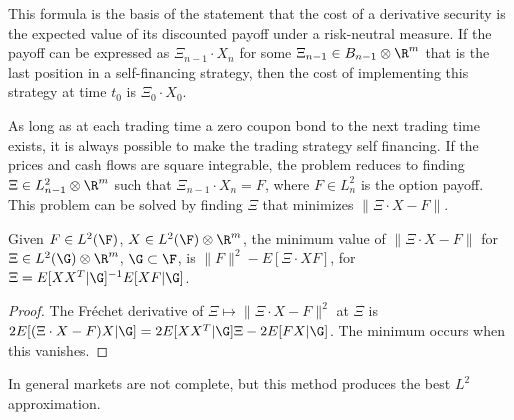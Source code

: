 This formula is the basis of the statement that the cost of a
derivative security is the expected value of its discounted payoff under
a risk-neutral measure. If the payoff can be expressed as $\Xi_{n -
1}\cdot X_n$ for some $\Xi_{n-1} \in B_{n-1}\otimes\R^m$ that
is the last position in a self-financing strategy, then the cost of
implementing this strategy at time $t_0$ is $\Xi_0\cdot X_0$.

As long as at each trading time a zero coupon bond to the next trading
time exists, it is always possible to make the trading strategy self
financing. If the prices and cash flows are square integrable, the problem
reduces to finding $\Xi\in L^2_{n-1}\otimes\R^m$ such that $\Xi_{n -
1}\cdot X_n = F$, where $F\in L^2_n$ is the option payoff. This problem
can be solved by finding $\Xi$ that minimizes $\|\Xi\cdot X - F\|$.

\begin{lemma}
Given $F\in L^2(\F)$, $X\in L^2(\F)\otimes\R^m$, the minimum
value of $\|\Xi\cdot X - F\|$ for $\Xi\in L^2(\G)\otimes\R^m$,
$\G\subset\F$, is $\|F\|^2 - E[\Xi\cdot X F]$, for $\Xi =
E[XX^T|\G]^{-1}E[XF|\G]$. 
\end{lemma}

\begin{proof}
The Fr\'echet derivative of $\Xi\mapsto\|\Xi\cdot X - F\|^2$ at $\Xi$
is $2E[(\Xi\cdot X - F)X|\G] = 2E[XX^T|\G]\Xi - 2E[FX|\G]$. The minimum
occurs when this vanishes.

\end{proof}

In general markets are not complete, but this method produces the
best $L^2$ approximation.

